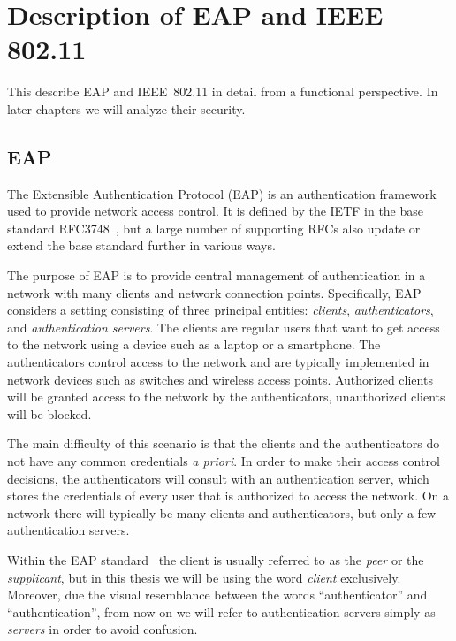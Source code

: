 \chapter{Description of EAP and IEEE 802.11}\label{sec:descriptions:EAP_&_802.11}


\begingroup
\hypersetup{linkcolor=black}
\minitoc
\endgroup

This  describe EAP and IEEE~802.11 in detail from a functional perspective.
In later chapters we will analyze their security.

\section{EAP}\label{sec:EAP:description}

The Extensible Authentication Protocol (EAP) is an authentication framework used to provide network access control. 
It is defined by the IETF in the base standard RFC3748~\cite{IETF:RFC3748:EAP},
but a large number of supporting RFCs also update or extend the base standard further in various ways. 

The purpose of EAP is to provide central management of authentication in a network with many clients and  network connection points.
Specifically,
EAP considers a setting consisting of three principal entities: 
\emph{clients}, \emph{authenticators}, and \emph{authentication servers}. 
The clients are regular users that want to get access to the network using a device such as a laptop or a smartphone.
The authenticators control access to the network and are typically implemented in network devices such as switches and wireless access points.
Authorized clients will be granted access to the network by the authenticators,
unauthorized clients will be blocked.


The main difficulty of this scenario is that the clients and the authenticators do not have any common credentials \emph{a priori}.
In order to make their access control decisions,
the authenticators will consult with an authentication server,
which stores the credentials of every user that is authorized to access the network.
On a network there will typically be many clients and authenticators,
but only a few  authentication servers.

\begin{remark}\label{remark:EAP&802.11:authenticator_vs_authentication}
Within the EAP standard~\cite{IETF:RFC3748:EAP} the client is usually referred to as the \emph{peer} or the \emph{supplicant},
but in this thesis we will be using the word \emph{client} exclusively.
Moreover,
due the visual resemblance between the words ``authenticator'' and ``authentication'',
from now on we will refer to authentication servers simply as \emph{servers} in order to avoid confusion. 
\end{remark}


